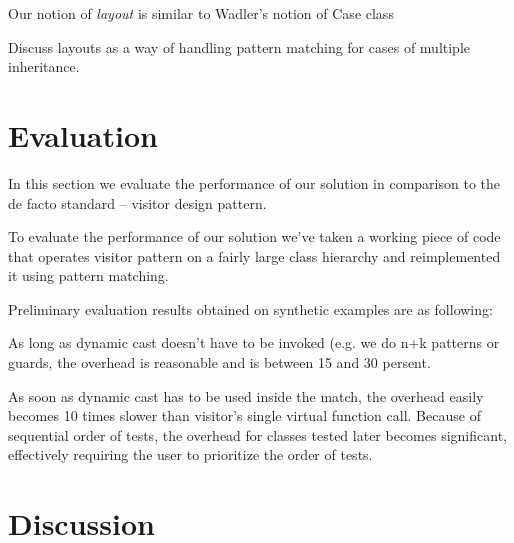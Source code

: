 \documentclass[preprint]{sigplanconf}
\begin{document}
Our notion of \emph{layout} is similar to Wadler's notion of Case class\cite{}

Discuss layouts as a way of handling pattern matching for cases of multiple 
inheritance.


\section{Evaluation} %
\label{sec:eval}

In this section we evaluate the performance of our solution in comparison to the 
de facto standard -- visitor design pattern.

To evaluate the performance of our solution we've taken a working piece of code 
that operates visitor pattern on a fairly large class hierarchy and 
reimplemented it using pattern matching.

Preliminary evaluation results obtained on synthetic examples are as following:

As long as dynamic cast doesn't have to be invoked (e.g. we do n+k patterns or 
guards, the overhead is reasonable and is between 15 and 30 persent.

As soon as dynamic cast has to be used inside the match, the overhead easily 
becomes 10 times slower than visitor's single virtual function call. Because of 
sequential order of tests, the overhead for classes tested later becomes 
significant, effectively requiring the user to prioritize the order of tests.

\section{Discussion} %
\label{sec:dsc}
\end{document}
